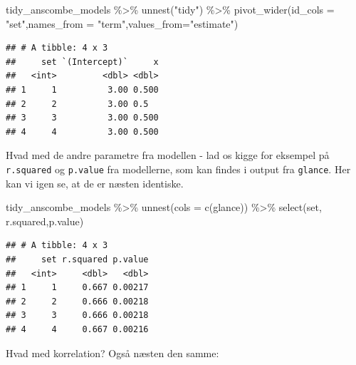 \documentclass[
]{book}
\newenvironment{Shaded}{\begin{snugshade}}{\end{snugshade}}
\newcommand{\AttributeTok}[1]{\textcolor[rgb]{0.77,0.63,0.00}{#1}}
\newcommand{\ErrorTok}[1]{\textcolor[rgb]{0.64,0.00,0.00}{\textbf{#1}}}
\newcommand{\FunctionTok}[1]{\textcolor[rgb]{0.00,0.00,0.00}{#1}}
\newcommand{\NormalTok}[1]{#1}
\newcommand{\OtherTok}[1]{\textcolor[rgb]{0.56,0.35,0.01}{#1}}
\newcommand{\SpecialCharTok}[1]{\textcolor[rgb]{0.00,0.00,0.00}{#1}}
\newcommand{\StringTok}[1]{\textcolor[rgb]{0.31,0.60,0.02}{#1}}
\begin{document}
\begin{Shaded}
\begin{Highlighting}[]
\NormalTok{tidy\_anscombe\_models }\SpecialCharTok{\%\textgreater{}\%} \FunctionTok{unnest}\NormalTok{(}\StringTok{"tidy"}\NormalTok{) }\SpecialCharTok{\%\textgreater{}\%} 
  \FunctionTok{pivot\_wider}\NormalTok{(}\AttributeTok{id\_cols =} \StringTok{"set"}\NormalTok{,}\AttributeTok{names\_from =} \StringTok{"term"}\NormalTok{,}\AttributeTok{values\_from=}\StringTok{"estimate"}\NormalTok{) }
\end{Highlighting}
\end{Shaded}

\begin{verbatim}
## # A tibble: 4 x 3
##     set `(Intercept)`     x
##   <int>         <dbl> <dbl>
## 1     1          3.00 0.500
## 2     2          3.00 0.5  
## 3     3          3.00 0.500
## 4     4          3.00 0.500
\end{verbatim}

Hvad med de andre parametre fra modellen - lad os kigge for eksempel på \texttt{r.squared} og \texttt{p.value} fra modellerne, som kan findes i output fra \texttt{glance}. Her kan vi igen se, at de er næsten identiske.

\begin{Shaded}
\begin{Highlighting}[]
\NormalTok{tidy\_anscombe\_models }\SpecialCharTok{\%\textgreater{}\%} 
  \FunctionTok{unnest}\NormalTok{(}\AttributeTok{cols =} \FunctionTok{c}\NormalTok{(glance)) }\SpecialCharTok{\%\textgreater{}\%} 
  \FunctionTok{select}\NormalTok{(set, r.squared,p.value)}
\end{Highlighting}
\end{Shaded}

\begin{verbatim}
## # A tibble: 4 x 3
##     set r.squared p.value
##   <int>     <dbl>   <dbl>
## 1     1     0.667 0.00217
## 2     2     0.666 0.00218
## 3     3     0.666 0.00218
## 4     4     0.667 0.00216
\end{verbatim}

Hvad med korrelation? Også næsten den samme:

\begin{Shaded}
\end{Shaded}
\end{document}
